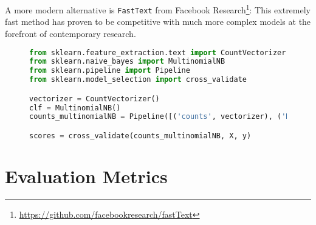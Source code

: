 \documentclass[]{article}
\begin{document}
A more modern alternative is \texttt{FastText} from Facebook Research\footnote{\url{https://github.com/facebookresearch/fastText}}: This extremely fast method has proven to be competitive with much more complex models at the forefront of contemporary research.

\begin{figure}[!htb]
\begin{lstlisting}[frame=single,language=python,caption={Benchmark model}]
from sklearn.feature_extraction.text import CountVectorizer
from sklearn.naive_bayes import MultinomialNB
from sklearn.pipeline import Pipeline
from sklearn.model_selection import cross_validate

vectorizer = CountVectorizer()
clf = MultinomialNB()
counts_multinomialNB = Pipeline([('counts', vectorizer), ('MultiNB', clf)])

scores = cross_validate(counts_multinomialNB, X, y)
\end{lstlisting}
\end{figure}

\section{Evaluation Metrics}
\end{document}
